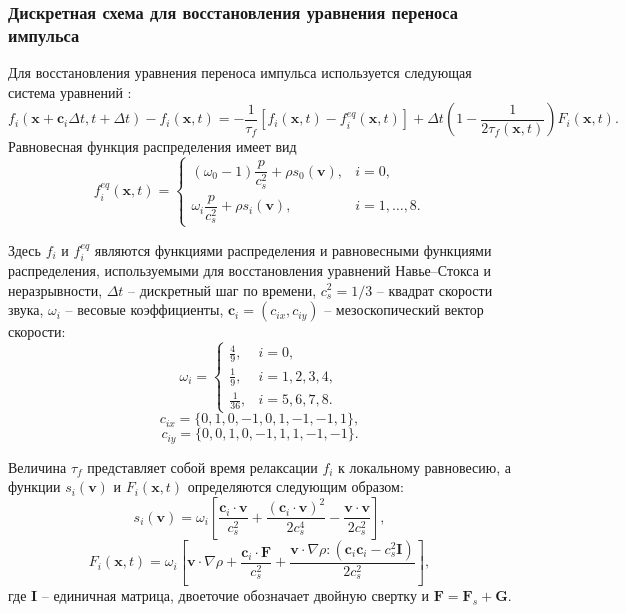 \documentclass[12pt,a4paper]{article}
\begin{document}
\subsubsection{Дискретная схема для восстановления уравнения переноса импульса}

Для восстановления уравнения переноса импульса используется следующая система уравнений \cite{Guo2000, Guo2002, Liang2018}:
\begin{equation}\label{eq:evolution_f_LBM}
		f_i(\mathbf{x}+\mathbf{c}_i \Delta t, t+\Delta t)-f_i(\mathbf{x},t) = -\frac{1}{\tau_f}\left[f_i(\mathbf{x},t)-f_i^{eq}(\mathbf{x},t)\right]  + \Delta t \left(1-\frac{1}{2\tau_f(\mathbf{x},t)}\right) F_i(\mathbf{x},t).
\end{equation}
Равновесная функция распределения имеет вид
\begin{equation}
	f_i^{eq}(\mathbf{x},t)=
	\begin{cases}
		(\omega_0-1)\dfrac{p}{c_s^2} + \rho s_0(\mathbf{v}),
		& i=0,\\
		\omega_i\dfrac{p}{c_s^2} + \rho s_i(\mathbf{v}),
		& i=1,\dots,8.
	\end{cases}
\end{equation}

Здесь $f_i$ и $f_i^{eq}$ являются функциями распределения и равновесными функциями распределения, используемыми для восстановления уравнений Навье--Стокса и неразрывности, $\Delta t$ -- дискретный шаг по времени, $c_s^2=1/3$ -- квадрат скорости звука, $\omega_i$ -- весовые коэффициенты, $\mathbf{c}_i=(c_{ix},c_{iy})$ -- мезоскопический вектор скорости:
$$
	\omega_i =
	\begin{cases}
		\frac{4}{9}, & i=0,\\
		\frac{1}{9}, & i=1,2,3,4,\\
		\frac{1}{36}, & i=5,6,7,8.
	\end{cases}
$$
$$
c_{ix} = \{ 0, 1, 0, -1, 0, 1, -1, -1, 1 \},
$$
$$
c_{iy} = \{ 0, 0, 1, 0, -1, 1, 1, -1, -1 \}.
$$

Величина $\tau_f$ представляет собой время релаксации $f_i$ к локальному равновесию, а функции $s_i(\mathbf{v})$ и $F_i(\mathbf{x},t)$ определяются следующим образом:
\begin{equation}
	s_i(\mathbf{v})=
	\omega_i
	\left[
	\frac{\mathbf{c}_i\cdot\mathbf{v}}{c_s^2}
	+\frac{(\mathbf{c}_i\cdot\mathbf{v})^2}{2c_s^4}
	-\frac{\mathbf{v}\cdot\mathbf{v}}{2c_s^2}
	\right],
\end{equation}
\begin{equation}
	F_i(\mathbf{x},t)=
	\omega_i
	\left[
	\mathbf{v}\cdot\nabla\rho
	+\frac{\mathbf{c}_i\cdot\mathbf{F}}{c_s^2}
	+\frac{\mathbf{v}\cdot\nabla\rho :
		(\mathbf{c}_i\mathbf{c}_i-c_s^2\mathbf{I})}{2c_s^2}
	\right],
\end{equation}
где $\mathbf{I}$ -- единичная матрица, двоеточие обозначает двойную свертку и $\mathbf{F}=\mathbf{F}_s+\mathbf{G}$.
\end{document}
